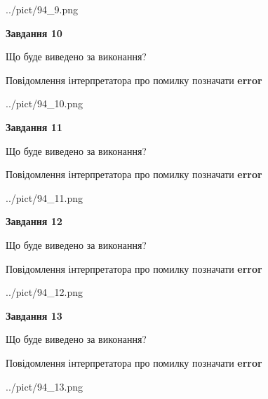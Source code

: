 \documentclass[11pt, ukrainian]{article}
\begin{document}
{\begin {large}
\begin{center}
	{../pict/94_9.png}
\end{center}
\newpage

{\begin {center}\textbf{Завдання 10}\end {center}}\par
Що буде виведено за виконання? \par
Повідомлення інтерпретатора про помилку позначати \textbf{error}

\begin{center}
	{../pict/94_10.png}
\end{center}
\newpage

{\begin {center}\textbf{Завдання 11}\end {center}}\par
Що буде виведено за виконання? \par
Повідомлення інтерпретатора про помилку позначати \textbf{error}

\begin{center}
	{../pict/94_11.png}
\end{center}
\newpage

{\begin {center}\textbf{Завдання 12}\end {center}}\par
Що буде виведено за виконання? \par
Повідомлення інтерпретатора про помилку позначати \textbf{error}

\begin{center}
	{../pict/94_12.png}
\end{center}
\newpage

{\begin {center}\textbf{Завдання 13}\end {center}}\par
Що буде виведено за виконання? \par
Повідомлення інтерпретатора про помилку позначати \textbf{error}

\begin{center}
	{../pict/94_13.png}
\end{center}
\newpage


\end{large}}
\end{document}
